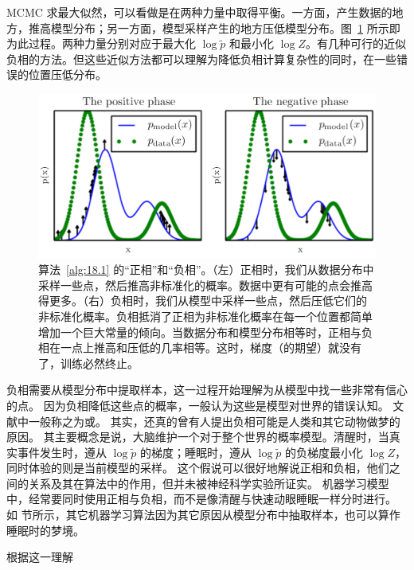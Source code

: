 MCMC 求最大似然，可以看做是在两种力量中取得平衡。一方面，产生数据的地方，推高模型分布；另一方面，模型采样产生的地方压低模型分布。图~\ref{fig:18.1} 所示即为此过程。两种力量分别对应于最大化 \(\log\widetilde{p}\) 和最小化 \(\log Z\)。有几种可行的近似负相的方法。但这些近似方法都可以理解为降低负相计算复杂性的同时，在一些错误的位置压低分布。

\begin{figure}[htbp] %
   \centering
   \includegraphics[width=\textwidth]{fig/chap18/18_1.png} 
   \caption{算法~\ref{alg:18.1} 的``正相''和``负相''。（左）正相时，我们从数据分布中采样一些点，然后推高非标准化的概率。数据中更有可能的点会推高得更多。（右）负相时，我们从模型中采样一些点，然后压低它们的非标准化概率。负相抵消了正相为非标准化概率在每一个位置都简单增加一个巨大常量的倾向。当数据分布和模型分布相等时，正相与负相在一点上推高和压低的几率相等。这时，梯度（的期望）就没有了，训练必然终止。}
   \label{fig:18.1}
\end{figure}

负相需要从模型分布中提取样本，这一过程开始理解为从模型中找一些非常有信心的点。
因为负相降低这些点的概率，一般认为这些是模型对世界的错误认知。
文献中一般称之为或。
其实，还真的曾有人提出负相可能是人类和其它动物做梦的原因。
其主要概念是说，大脑维护一个对于整个世界的概率模型。清醒时，当真实事件发生时，遵从 \(\log\widetilde{p}\) 的梯度；睡眠时，遵从 \(\log\widetilde{p}\) 的负梯度最小化 \(\log Z\)，同时体验的则是当前模型的采样。
这个假说可以很好地解说正相和负相，他们之间的关系及其在算法中的作用，但并未被神经科学实验所证实。
机器学习模型中，经常要同时使用正相与负相，而不是像清醒与快速动眼睡眠一样分时进行。
如  节所示，其它机器学习算法因为其它原因从模型分布中抽取样本，也可以算作睡眠时的梦境。

根据这一理解


